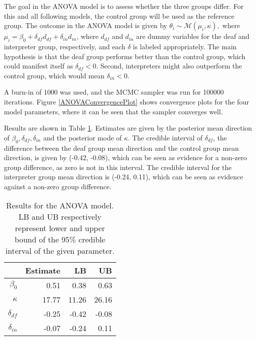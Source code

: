 The goal in the ANOVA model is to assess whether the three groups differ. For this and all following models, the control group will be used as the reference group. The outcome in the ANOVA model is given by \( \theta_i \sim \mathcal{M}(\mu_i, \kappa), \) where \( \mu_i = \beta_0 + \delta_{df} d_{df} + \delta_{in} d_{in}\), where \( d_{df} \) and \( d_{in} \) are dummy variables for the deaf and interpreter group, respectively, and each \( \delta \) is labeled appropriately. The main hypothesis is that the deaf group performs better than the control group, which could manifest itself as \( \delta_{df} < 0.\) Second, interpreters might also outperform the control group, which would mean \( \delta_{in} < 0.\)

A burn-in of 1000 was used, and the MCMC sampler was run for 100000 iterations. Figure \ref{ANOVAConvergencePlot} shows convergence plots for the four model parameters, where it can be seen that the sampler converges well.

Results are shown in Table \ref{ANOVATable}. Estimates are given by the posterior mean direction of \( \beta_0, \delta_{df}, \delta_{in} \) and  the posterior mode of \( \kappa.\) The credible interval of  \( \delta_{df} \), the difference between the deaf group mean direction and the control group mean direction, is given by (-0.42, -0.08), which can be seen as evidence for a non-zero group difference, as zero is not in this interval. The credible interval for the interpreter group mean direction is (-0.24, 0.11), which can be seen as evidence against a non-zero group difference.

\begin{table}[btp]
\centering
\caption{Results for the ANOVA model. LB and UB respectively represent lower and upper bound of the 95\% credible interval of the given parameter.} 
\label{ANOVATable}
\begin{tabular}{rrrr}
  \toprule
 & Estimate & LB & UB \\ 
  \midrule
$\beta_0$ & 0.51 & 0.38 & 0.63 \\ 
  $\kappa$ & 17.77 & 11.26 & 26.16 \\ 
  $\delta_{df}$ & -0.25 & -0.42 & -0.08 \\ 
  $\delta_{in}$ & -0.07 & -0.24 & 0.11 \\ 
   \bottomrule
\end{tabular}
\end{table}





